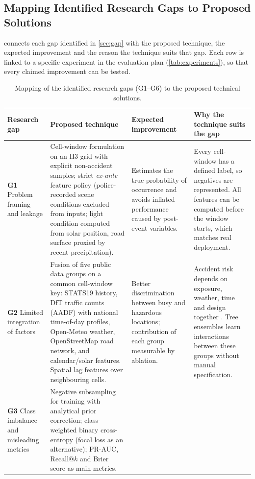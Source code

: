 \subsection{Mapping Identified Research Gaps to Proposed Solutions}
\label{sec:mapping}

 connects each gap identified in \cref{sec:gap} with the proposed technique, the expected improvement and the reason the technique suits that gap. Each row is linked to a specific experiment in the evaluation plan (\cref{tab:experiments}), so that every claimed improvement can be tested.

\begin{table}[t]
\centering
\caption{Mapping of the identified research gaps (G1--G6) to the proposed technical solutions.}
\label{tab:gapmap}
\footnotesize
\begin{tabularx}{\textwidth}{L{2.3cm} Y Y Y}
\toprule
\textbf{Research gap} & \textbf{Proposed technique} & \textbf{Expected improvement} & \textbf{Why the technique suits the gap} \\
\midrule
\textbf{G1} Problem framing and leakage &
Cell-window formulation on an H3 grid with explicit non-accident samples; strict \emph{ex-ante} feature policy (police-recorded scene conditions excluded from inputs; light condition computed from solar position, road surface proxied by recent precipitation). &
Estimates the true probability of occurrence and avoids inflated performance caused by post-event variables. &
Every cell-window has a defined label, so negatives are represented. All features can be computed before the window starts, which matches real deployment. \\
\addlinespace
\textbf{G2} Limited integration of factors &
Fusion of five public data groups on a common cell-window key: STATS19 history, DfT traffic counts (AADF) with national time-of-day profiles, Open-Meteo weather, OpenStreetMap road network, and calendar/solar features. Spatial lag features over neighbouring cells. &
Better discrimination between busy and hazardous locations; contribution of each group measurable by ablation. &
Accident risk depends on exposure, weather, time and design together \cite{theofilatos2014review,lord2010statistical}. Tree ensembles learn interactions between these groups without manual specification. \\
\addlinespace
\textbf{G3} Class imbalance and misleading metrics &
Negative subsampling for training with analytical prior correction; class-weighted binary cross-entropy (focal loss as an alternative); PR-AUC, Recall@$k$ and Brier score as main metrics. &

\end{tabularx}
\end{table}
